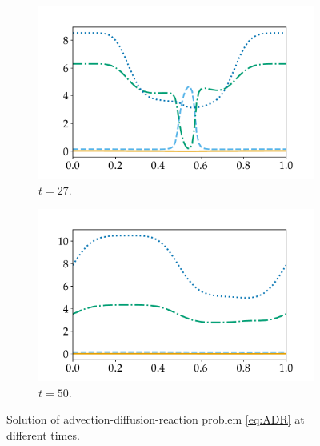 \documentclass[a4paper]{article}
\numberwithin{equation}{section}
\theoremstyle{plain}
\theoremstyle{definition}
\numberwithin{theorem}{section}
\newcommand{\1}{\mathbbm{1}}
\begin{document}
\begin{figure}
    \begin{subfigure}[b]{0.49\textwidth}
        \includegraphics[width=\textwidth]{plots/ADP_sol_27.pdf}
        \caption{$t=27$.}
        \label{fig:sol_ADP27}
    \end{subfigure}
	\begin{subfigure}[b]{0.49\textwidth}
        \includegraphics[width=\textwidth]{plots/ADP_sol_50.pdf}
        \caption{$t=50$.}
        \label{fig:sol_ADP50}
    \end{subfigure}
    \caption{Solution of advection-diffusion-reaction problem \eqref{eq:ADR} at different times.}\label{fig:Sol_ADP}
\end{figure}
\end{document}

